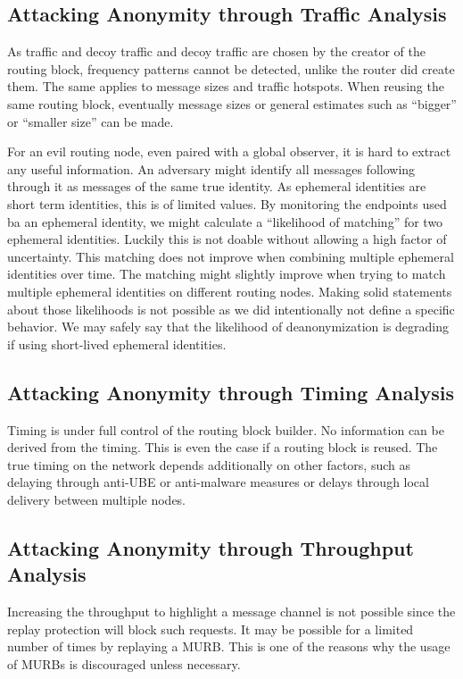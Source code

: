 \subsection{Attacking Anonymity through Traffic Analysis}
As traffic and decoy traffic and decoy traffic are chosen by the creator of the routing block, frequency patterns cannot be detected, unlike the router did create them. The same applies to message sizes and traffic hotspots. When reusing the same routing block, eventually message sizes or general estimates such as ``bigger'' or ``smaller size'' can be made.

For an evil routing node, even paired with a global observer, it is hard to extract any useful information. An adversary might identify all messages following through it as messages of the same true identity. As ephemeral identities are short term identities, this is of limited values. By monitoring the endpoints used ba an ephemeral identity, we might calculate a ``likelihood of matching'' for two ephemeral identities. Luckily this is not doable without allowing a high factor of uncertainty. This matching does not improve when combining multiple ephemeral identities over time. The matching might slightly improve when trying to match multiple ephemeral identities on different routing nodes. Making solid statements about those likelihoods is not possible as we did intentionally not define a specific behavior. We may safely say that the likelihood of deanonymization is degrading if using short-lived ephemeral identities.

\subsection{Attacking Anonymity through Timing Analysis}
Timing is under full control of the routing block builder. No information can be derived from the timing. This is even the case if a routing block is reused. The true timing on the network depends additionally on other factors, such as delaying through anti-UBE or anti-malware measures or delays through local delivery between multiple nodes.

\subsection{Attacking Anonymity through Throughput Analysis}
Increasing the throughput to highlight a message channel is not possible since the replay protection will block such requests. It may be possible for a limited number of times by replaying a MURB. This is one of the reasons why the usage of MURBs is discouraged unless necessary.

